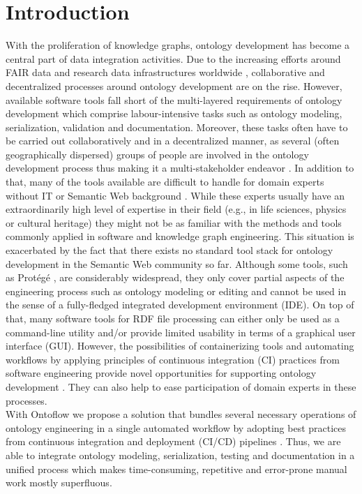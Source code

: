 \documentclass[sigconf]{acmart}
\begin{document}
\section{Introduction}
With the proliferation of knowledge graphs, ontology development has become a central part of data integration activities. Due to the increasing efforts around FAIR data and research data infrastructures worldwide \cite{fair}, collaborative and decentralized processes around ontology development are on the rise. However, available software tools fall short of the multi-layered requirements of ontology development which comprise labour-intensive tasks such as ontology modeling, serialization, validation and documentation. Moreover, these tasks often have to be carried out collaboratively and in a decentralized manner, as several (often geographically dispersed) groups of people are involved in the ontology development process thus making it a multi-stakeholder endeavor \cite{sure}. In addition to that, many of the tools available are difficult to handle for domain experts without IT or Semantic Web background \cite{tudorache}. While these experts usually have an extraordinarily high level of expertise in their field (e.g., in life sciences, physics or cultural heritage) they might not be as familiar with the methods and tools commonly applied in software and knowledge graph engineering. This situation is exacerbated by the fact that there exists no standard tool stack for ontology development in the Semantic Web community so far. Although some tools, such as Protégé \cite{protege}, are considerably widespread, they only cover partial aspects of the engineering process such as ontology modeling or editing and cannot be used in the sense of a fully-fledged integrated development environment (IDE). On top of that, many software tools for RDF file processing can either only be used as a command-line utility and/or provide limited usability in terms of a graphical user interface (GUI). However, the possibilities of containerizing tools and automating workflows by applying principles of continuous integration (CI) practices from software engineering provide novel opportunities for supporting ontology development \cite{fowler}. They can also help to ease participation of domain experts in these processes.\\
With Ontoflow we propose a solution that bundles several necessary operations of ontology engineering in a single automated workflow by adopting best practices from continuous integration and deployment (CI/CD) pipelines \cite{humble}. Thus, we are able to integrate ontology modeling, serialization, testing and documentation in a unified process which makes time-consuming, repetitive and error-prone manual work mostly superfluous. 
\end{document}
